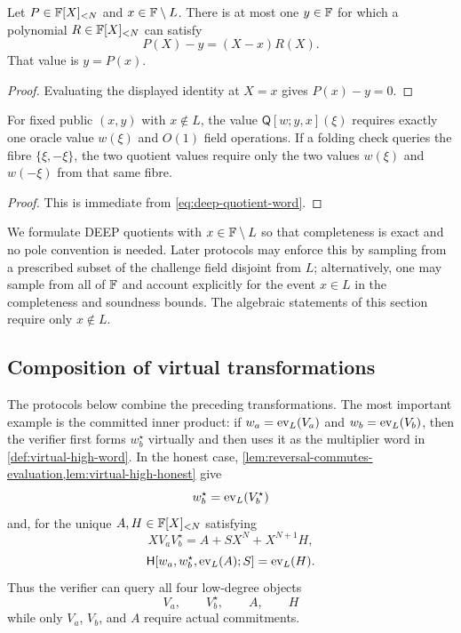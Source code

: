 \begin{corollary}
\label{cor:deep-opening-unique}
Let $P\in\mathbb{F}[X]_{<N}$ and $x\in\mathbb{F}\setminus L$.  There is at most one $y\in\mathbb{F}$ for which a polynomial $R\in\mathbb{F}[X]_{<N}$ can satisfy
\[
  P(X)-y=(X-x)R(X).
\]
That value is $y=P(x)$.
\end{corollary}

\begin{proof}
Evaluating the displayed identity at $X=x$ gives $P(x)-y=0$.
\end{proof}

\begin{lemma}
\label{lem:deep-locality}
For fixed public $(x,y)$ with $x\notin L$, the value $\mathsf Q[w;y,x](\xi)$ requires exactly one oracle value $w(\xi)$ and $O(1)$ field operations.  If a folding check queries the fibre $\{\xi,-\xi\}$, the two quotient values require only the two values $w(\xi)$ and $w(-\xi)$ from that same fibre.
\end{lemma}

\begin{proof}
This is immediate from \eqref{eq:deep-quotient-word}.
\end{proof}

\begin{remark}
\label{rem:deep-poles}
We formulate DEEP quotients with $x\in\mathbb{F}\setminus L$ so that completeness is exact and no pole convention is needed.  Later protocols may enforce this by sampling from a prescribed subset of the challenge field disjoint from $L$; alternatively, one may sample from all of $\mathbb{F}$ and account explicitly for the event $x\in L$ in the completeness and soundness bounds.  The algebraic statements of this section require only $x\notin L$.
\end{remark}

\subsection{Composition of virtual transformations}
\label{sec:virtual-composition}

The protocols below combine the preceding transformations.  The most important example is the committed inner product: if $w_a=\operatorname{ev}_L(V_a)$ and $w_b=\operatorname{ev}_L(V_b)$, then the verifier first forms $w_b^{\star}$ virtually and then uses it as the multiplier word in \cref{def:virtual-high-word}.  In the honest case, \cref{lem:reversal-commutes-evaluation,lem:virtual-high-honest} give
\[
  w_b^{\star}=\operatorname{ev}_L(V_b^{\star})
\]
and, for the unique $A,H\in\mathbb{F}[X]_{<N}$ satisfying
\[
  XV_aV_b^{\star}=A+SX^N+X^{N+1}H,
\]
\[
  \mathsf H[w_a,w_b^{\star},\operatorname{ev}_L(A);S]=\operatorname{ev}_L(H).
\]
Thus the verifier can query all four low-degree objects
\[
  V_a,\qquad V_b^{\star},\qquad A,\qquad H
\]
while only $V_a$, $V_b$, and $A$ require actual commitments.


